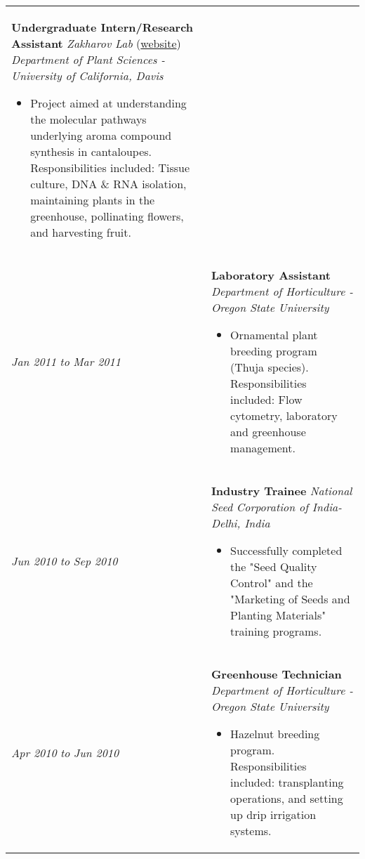 ﻿\documentclass[a4paper]{article}
\begin{document}
\begin{tabular}{p{3cm} p{14cm}}
\textbf{Undergraduate Intern/Research Assistant}\newline
\textit{Zakharov Lab} (\href{http://www.plantsciences.ucdavis.edu/faculty/zakharov/}{website})\newline
\textit{Department of Plant Sciences - University of California, Davis}
\begin{itemize}[noitemsep,topsep=0pt]
  \item Project aimed at understanding the molecular pathways underlying aroma compound synthesis in cantaloupes. Responsibilities included: Tissue culture, DNA \& RNA isolation, maintaining plants in the greenhouse, pollinating flowers, and harvesting fruit.
\end{itemize}
%
\\
%
\vspace{0pt} 
\textit{Jan 2011}\newline
\textit{to}\newline
\textit{Mar 2011}\newline
&
\vspace{0pt}
\textbf{Laboratory Assistant}\newline
\textit{Department of Horticulture - Oregon State University}
\begin{itemize}[noitemsep,topsep=0pt]
  \item Ornamental plant breeding program (Thuja species). Responsibilities included: Flow cytometry, laboratory and greenhouse management.
\end{itemize}
%
\\
%
\vspace{0pt} 
\textit{Jun 2010}\newline
\textit{to}\newline
\textit{Sep 2010}\newline
&
\vspace{0pt}
\textbf{Industry Trainee}\newline
\textit{National Seed Corporation of India- Delhi, India}
\begin{itemize}[noitemsep,topsep=0pt]
  \item Successfully completed the "Seed Quality Control" and the "Marketing of Seeds and Planting Materials" training programs.
\end{itemize}
%
\\
%
\vspace{0pt} 
\textit{Apr 2010}\newline
\textit{to}\newline
\textit{Jun 2010}\newline
&
\vspace{0pt}
\textbf{Greenhouse Technician}\newline
\textit{Department of Horticulture - Oregon State University}
\begin{itemize}[noitemsep,topsep=0pt]
  \item Hazelnut breeding program. Responsibilities included: transplanting operations, and setting up drip irrigation systems.
\end{itemize}
\end{tabular}
\end{document}
